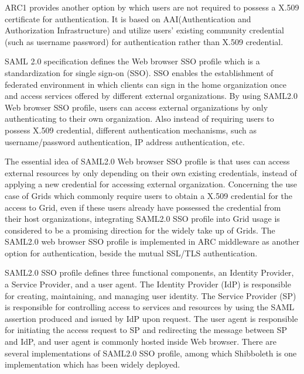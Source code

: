 \documentclass{book}
\begin{document}
   ARC1 provides another option by which users are not required to possess a X.509 certificate for authentication. It is based on AAI(Authentication and Authorization Infrastructure) and utilize users' existing community credential (such as username password) for authentication rather than X.509 credential.

   SAML 2.0 specification defines the Web browser SSO profile which is a standardization for single sign-on (SSO). SSO enables the establishment of federated environment in which clients can sign in the home organization once and access services offered by different external organizations. By using SAML2.0 Web browser SSO profile, users can access external organizations by only authenticating to their own organization. Also instead of requiring users to possess X.509 credential, different authentication mechanisms, such as username/password authentication, IP address authentication, etc.

  The essential idea of SAML2.0 Web browser SSO profile is that uses can access external resources by only depending on their own existing credentials, instead of applying a new credential for accessing external organization. Concerning the use case of Grids which commonly require users to obtain a X.509 credential for the access to Grid, even if these users already have possessed the credential from their host organizations, integrating SAML2.0 SSO profile into Grid usage is considered to be a promising direction for the widely take up of Grids. The SAML2.0 web browser SSO profile is implemented in ARC middleware as another option for authentication, beside the mutual SSL/TLS authentication.

  SAML2.0 SSO profile defines three functional components, an Identity Provider, a Service Provider, and a user agent. The Identity Provider (IdP) is responsible for creating, maintaining, and managing user identity.  The Service Provider (SP) is responsible for controlling access to services and resources by using the SAML assertion produced and issued by IdP upon request. The user agent is responsible for initiating the access request to SP and redirecting the message between SP and IdP, and user agent is commonly hosted inside Web browser. There are several implementations of SAML2.0 SSO profile, among which Shibboleth is one implementation which has been widely deployed.
\end{document}
